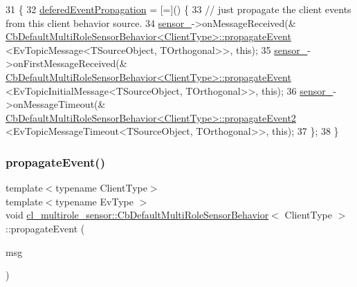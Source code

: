 \begin{DoxyCode}
31   \{
32     \hyperlink{classcl__multirole__sensor_1_1CbDefaultMultiRoleSensorBehavior_a18f86fd2fd9c3575b62a2c58953b7d33}{deferedEventPropagation} = [=]() \{
33       \textcolor{comment}{// just propagate the client events from this client behavior source.}
34       \hyperlink{classcl__multirole__sensor_1_1CbDefaultMultiRoleSensorBehavior_a201893c3c859259eac3166405f3509cb}{sensor\_}->onMessageReceived(&
      \hyperlink{classcl__multirole__sensor_1_1CbDefaultMultiRoleSensorBehavior_af0017775207108c81f879fe222a69ea9}{CbDefaultMultiRoleSensorBehavior<ClientType>::propagateEvent}
      <EvTopicMessage<TSourceObject, TOrthogonal>>, \textcolor{keyword}{this});
35       \hyperlink{classcl__multirole__sensor_1_1CbDefaultMultiRoleSensorBehavior_a201893c3c859259eac3166405f3509cb}{sensor\_}->onFirstMessageReceived(&
      \hyperlink{classcl__multirole__sensor_1_1CbDefaultMultiRoleSensorBehavior_af0017775207108c81f879fe222a69ea9}{CbDefaultMultiRoleSensorBehavior<ClientType>::propagateEvent}
      <EvTopicInitialMessage<TSourceObject, TOrthogonal>>, \textcolor{keyword}{this});
36       \hyperlink{classcl__multirole__sensor_1_1CbDefaultMultiRoleSensorBehavior_a201893c3c859259eac3166405f3509cb}{sensor\_}->onMessageTimeout(&
      \hyperlink{classcl__multirole__sensor_1_1CbDefaultMultiRoleSensorBehavior_ac8773ca7b467bad85219261f5d23a3ce}{CbDefaultMultiRoleSensorBehavior<ClientType>::propagateEvent2}
      <EvTopicMessageTimeout<TSourceObject, TOrthogonal>>, \textcolor{keyword}{this});
37     \};
38   \}
\end{DoxyCode}
\mbox{\label{classcl__multirole__sensor_1_1CbDefaultMultiRoleSensorBehavior_af0017775207108c81f879fe222a69ea9}} 
\subsubsection{\texorpdfstring{propagate\+Event()}{propagateEvent()}}
{\footnotesize\ttfamily template$<$typename Client\+Type$>$ \\
template$<$typename Ev\+Type $>$ \\
void \hyperlink{classcl__multirole__sensor_1_1CbDefaultMultiRoleSensorBehavior}{cl\+\_\+multirole\+\_\+sensor\+::\+Cb\+Default\+Multi\+Role\+Sensor\+Behavior}$<$ Client\+Type $>$\+::propagate\+Event (\begin{DoxyParamCaption}\item[{const \hyperlink{classcl__multirole__sensor_1_1CbDefaultMultiRoleSensorBehavior_aa23bc8c99de1eddad01d094bdab62aa4}{T\+Message\+Type} \&}]{msg }\end{DoxyParamCaption})\hspace{0.3cm}{\ttfamily [inline]}}



